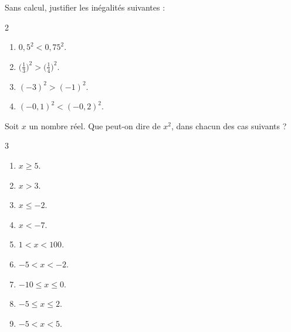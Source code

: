 
\exo

Sans calcul, justifier les inégalités suivantes :

\vspace{-6pt}
\setlength{\columnsep}{1cm}
\setlength{\columnseprule}{0pt}
\begin{multicols}{2}
\begin{enumerate}
\item $0,5^2 < 0,75^2$.
\medskip
\item $\big(\frac{1}{3}\big)^2 > \big(\frac{1}{4}\big)^2$.
\item $(-3)^2 > (-1)^2$.
\medskip
\item $(-0,1)^2 < (-0,2)^2$.
\end{enumerate}
\end{multicols}

\exo

Soit $x$ un nombre réel. Que peut-on dire de $x^2$, dans chacun des cas suivants ?
\vspace{-6pt}
\setlength{\columnsep}{1cm}
\setlength{\columnseprule}{0pt}
\begin{multicols}{3}
\begin{enumerate}
\item $x\geqslant 5$.
\medskip
\item $x> 3$.
\medskip
\item $x\leqslant -2$.
\item $x< -7$.
\medskip
\item $1<x<100$.
\medskip
\item $-5<x<-2$.
\item $-10\leqslant x\leqslant 0$.
\medskip
\item $-5\leqslant x\leqslant 2$.
\medskip
\item $-5<x<5$.
\end{enumerate}
\end{multicols}

\exo

